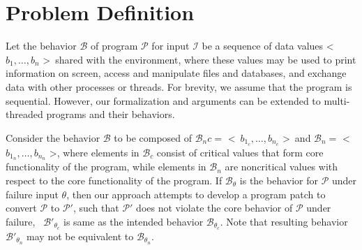 \section{Problem Definition}
\label{sec:definition}

Let the behavior $\mathcal{B}$ of program $\mathcal{P}$ for input $\mathcal{I}$
be a sequence of data values \textless\ $b_1, \ldots, b_n$ \textgreater\ shared
with the environment, where these values may be used to print information on
screen, access and manipulate files and databases, and exchange data with other
processes or threads. For brevity, we assume that the program is sequential.
However, our formalization and arguments can be extended to multi-threaded
programs and their behaviors.

Consider the behavior $\mathcal{B}$ to be composed of $\mathcal{B}_nc =$
\textless\ $b_{1_c}, \ldots, b_{n_c}$ \textgreater\ and $\mathcal{B}_n =$
\textless\ $b_{1_n}, \ldots, b_{n_n}$ \textgreater, where elements in
$\mathcal{B}_c$ consist of critical values that form core functionality of the program, while elements in
$\mathcal{B}_n$ are noncritical values with respect to the core functionality of
the program.
%  
% 
%  
% 
If $\mathcal{B}_{\theta}$ is the behavior for $\mathcal{P}$ under failure input
$\theta$, then our approach attempts to
develop a program patch to convert $\mathcal{P}$ to $\mathcal{P}'$,
such that 
 $\mathcal{P}'$ does not violate the core behavior of $\mathcal{P}$ under
failure, \ie\ $\mathcal{B}'_{\theta_c}$ is same as the intended behavior
$\mathcal{B}_{\theta_c}$.
Note that resulting behavior $\mathcal{B}'_{\theta_n}$ may not be
equivalent to $\mathcal{B}_{\theta_n}$.


